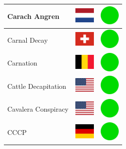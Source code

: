 \documentclass[12pt, a4paper, twoside]{report}
\begin{document}
\begin{center}
\begin{longtable}{|p{5cm}|p{2cm}|p{2cm}|}
 Carach Angren                                              & \includegraphics[width=1cm]{4x3/nl} &   \includegraphics[width=1cm]{likes/y} \\ \hline
 Carnal Decay                                               & \includegraphics[width=1cm]{4x3/ch} &   \includegraphics[width=1cm]{likes/y} \\ \hline
 Carnation                                                  & \includegraphics[width=1cm]{4x3/be} &   \includegraphics[width=1cm]{likes/y} \\ \hline
 Cattle Decapitation                                        & \includegraphics[width=1cm]{4x3/us} &   \includegraphics[width=1cm]{likes/y} \\ \hline
 Cavalera Conspiracy                                        & \includegraphics[width=1cm]{4x3/us} &   \includegraphics[width=1cm]{likes/y} \\ \hline
 CCCP                                                       & \includegraphics[width=1cm]{4x3/de} &   \includegraphics[width=1cm]{likes/y} \\ \hline

\end{longtable}
\end{center}
\end{document}
